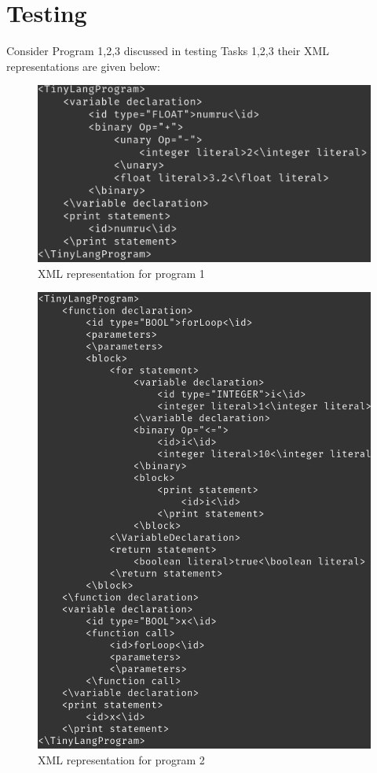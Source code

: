 \section{Testing}
Consider Program 1,2,3 discussed in testing Tasks 1,2,3 their XML representations are given below:
\begin{figure}[H]
    \centering
    \includegraphics[scale=0.5]{Task345/images/xmlOutput1.png}
    \caption{XML representation for program 1}
    \label{fig:xml tree 1}
\end{figure}
\begin{figure}[H]
    \centering
    \includegraphics[scale=0.5]{Task345/images/xmlOutput2.png}
    \caption{XML representation for program 2}
    \label{fig:xml tree 2}
\end{figure}

